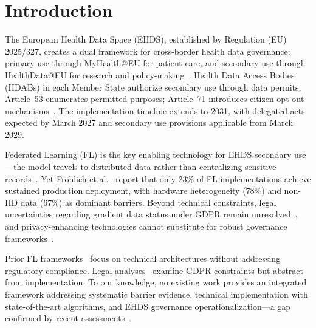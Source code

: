 \documentclass[conference,letterpaper]{IEEEtran}
\begin{document}
\section{Introduction}
\label{sec:introduction}

The European Health Data Space (EHDS), established by Regulation (EU) 2025/327, creates a dual framework for cross-border health data governance: primary use through MyHealth@EU for patient care, and secondary use through HealthData@EU for research and policy-making~\cite{eu2025ehds}. Health Data Access Bodies (HDABs) in each Member State authorize secondary use through data permits; Article~53 enumerates permitted purposes; Article~71 introduces citizen opt-out mechanisms~\cite{staunton2024ethical}. The implementation timeline extends to 2031, with delegated acts expected by March 2027 and secondary use provisions applicable from March 2029.

Federated Learning (FL) is the key enabling technology for EHDS secondary use---the model travels to distributed data rather than centralizing sensitive records~\cite{mcmahan2017communication, kairouz2021advances}. Yet Fr\"ohlich et al.~\cite{frohlich2025reality} report that only 23\% of FL implementations achieve sustained production deployment, with hardware heterogeneity (78\%) and non-IID data (67\%) as dominant barriers. Beyond technical constraints, legal uncertainties regarding gradient data status under GDPR remain unresolved~\cite{quinn2024gdpr}, and privacy-enhancing technologies cannot substitute for robust governance frameworks~\cite{vandrumpt2025pets}.

Prior FL frameworks~\cite{rieke2020future, beutel2023flower, nvflare2023} focus on technical architectures without addressing regulatory compliance. Legal analyses~\cite{quinn2024gdpr, staunton2024ethical} examine GDPR constraints but abstract from implementation. To our knowledge, no existing work provides an integrated framework addressing systematic barrier evidence, technical implementation with state-of-the-art algorithms, and EHDS governance operationalization---a gap confirmed by recent assessments~\cite{chaverodiez2026fair, teo2024systematic}.
\end{document}

